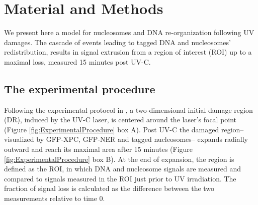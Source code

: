 \documentclass[12pt]{article}
\begin{document}
 \section{Material and Methods} 
	
	We present here a model for nucleosomes and DNA re-organization following
	UV damages. The cascade of events leading to tagged DNA and nucleosomes'
	redistribution, results in signal extrusion from a region of interest (ROI) up
	to a maximal loss, measured 15 minutes post UV-C.
	
 \subsection{The experimental procedure}
	Following the experimental protocol in \cite{adam2015imaging}, a two-dimensional initial damage region (DR), induced by the UV-C laser, is centered around the laser's focal point (Figure \ref{fig:ExperimentalProcedure} box A). Post UV-C the damaged region-- visualized by GFP-XPC, GFP-NER and tagged nucleosomes-- expands radially outward and reach its maximal area after 15 minutes (Figure \ref{fig:ExperimentalProcedure} box B). At the end of expansion, the region is defined as the ROI, in which DNA and nucleosome signals are measured and compared to signals measured in the ROI just prior to UV irradiation. The fraction of signal loss is calculated as the difference between the two measurements relative to time 0.
	
\end{document}
